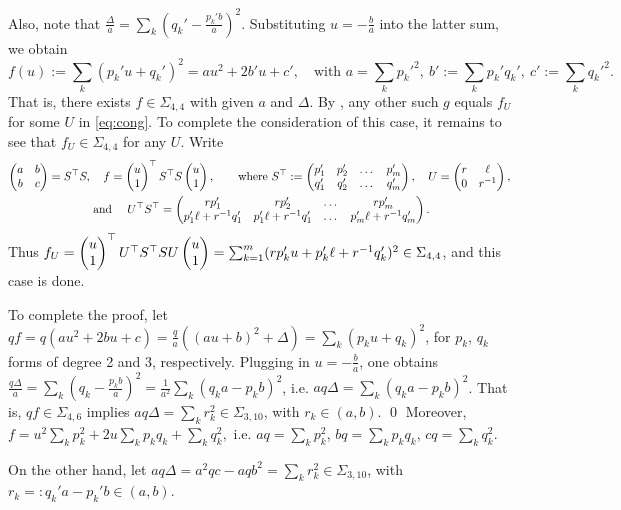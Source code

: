 \documentclass[a4paper,twoside,reqno]{amsart}
\newcommand{\SosH}[2]{\Sigma_{{#1},{#2}}}
\theoremstyle{plain}
\theoremstyle{definition}
\theoremstyle{remark}
\begin{document}
Also, note that $\frac{\Delta}{a}=\sum_k (q_k'-\frac{p_k'b}{a})^2$.
Substituting  $u=-\frac{b}{a}$ into the latter sum, we obtain
\begin{equation}\label{eq:fdelta}
f(u):=\sum_k(p_k'u+q_k')^2=au^2+2b'u+c', \quad\text{with }
a=\sum_k p_k'^2,\ b':=\sum_k p_k' q_k',\ c':=\sum_k q_k'^2.
\end{equation}
That is, there exists $f\in \SosH{4}{4}$ with given $a$ and $\Delta$.
By , any other such $g$ equals $f_U$ for
some $U$ in \eqref{eq:cong}. To complete the consideration of this case,
it remains to see that $f_U\in \SosH{4}{4}$ for any $U$.
Write 
\begin{multline*}
  \begin{pmatrix}a&b\\ b&c\end{pmatrix}=S^\top S,\quad f=\uv^\top S^\top S\uv,\qquad
  \text{where } S^\top:=\begin{pmatrix}p_1'&p_2'&\dots &p_m'\\
    q_1'&q_2'&\dots &q_m'\end{pmatrix},
    \quad U=\begin{pmatrix} r&\ell\\ 0&r^{-1}\end{pmatrix},
    \\
    \text{ and }\quad U^\top S^\top=\begin{pmatrix}rp_1'&rp_2'&\dots &rp_m'\\
    p_1'\ell+r^{-1}q_1'&p_1'\ell+r^{-1}q_1'&\dots &p_m'\ell+r^{-1}q_m'\end{pmatrix}.
\end{multline*}
Thus $f_U=\uv^\top U^\top S^\top SU\uv=\sum_{k=1}^m (rp'_k u +p_k'\ell+r^{-1}q_k')^2\in\SosH{4}{4}$,
and this case is done.

To complete the proof, let $qf=q(au^2+2bu+c)=\frac{q}{a}((au+b)^2+\Delta)=\sum_k (p_ku+q_k)^2$, for $p_k$, $q_k$ forms of degree 2 and 3, respectively.
Plugging in $u=-\frac{b}{a}$, one obtains 
$\frac{q\Delta}{a}=\sum_k (q_k-\frac{p_kb}{a})^2=\frac{1}{a^2}\sum_k (q_ka-p_kb)^2$, i.e. $aq\Delta=\sum_k (q_ka-p_kb)^2$. That is, $qf\in\SosH{4}{6}$ implies $aq\Delta=\sum_k r_k^2\in\SosH{3}{10}$, with $r_k\in (a,b)$. 
\qed
\iffalse
Moreover,
$f=u^2\sum_k p_k^2+2u\sum_k p_k q_k+\sum_k q_k^2,$
i.e. $aq=\sum_k p_k^2$, $bq=\sum_k p_k q_k$, $cq=\sum_k q_k^2$.

On the other hand, let $aq\Delta=a^2qc-aqb^2=\sum_k r_k^2\in\SosH{3}{10}$, with $r_k=:q_k'a-p_k'b\in (a,b)$. 
\end{document}
